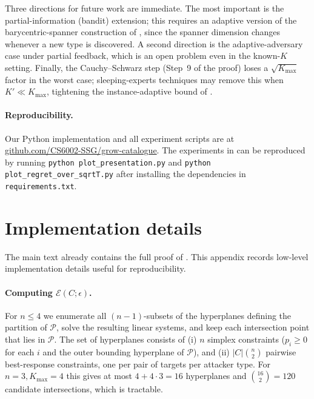 \documentclass[letterpaper,9pt,twocolumn]{extarticle}
\newcommand{\cP}{\mathcal{P}}
\newcommand{\cE}{\mathcal{E}}
\newcommand{\Kmax}{K_{\max}}
\theoremstyle{plain}
\theoremstyle{definition}
\theoremstyle{remark}
\begin{document}
Three directions for future work are immediate. The most important is the
partial-information (bandit) extension; this requires an adaptive version
of the barycentric-spanner construction of \citet[\S 6]{balcan2015},
since the spanner dimension changes whenever a new type is discovered.
A second direction is the adaptive-adversary case under partial feedback,
which is an open problem even in the known-$K$ setting. Finally, the
Cauchy--Schwarz step (Step~9 of the proof) loses a $\sqrt{\Kmax}$ factor
in the worst case; sleeping-experts techniques \citep{mourtada2017} may
remove this when $K'\ll\Kmax$, tightening the instance-adaptive bound of
.

\paragraph{Reproducibility.}
Our Python implementation and all experiment scripts are at
\textcolor{blue}{\href{https://github.com/CS6002-SSG/grow-catalogue}{github.com/CS6002-SSG/grow-catalogue}}. The experiments
in  can be reproduced by running
\texttt{python plot\_presentation.py} and
\texttt{python plot\_regret\_over\_sqrtT.py} after installing the
dependencies in \texttt{requirements.txt}.



\onecolumn
\appendix
\section{Implementation details}
\label{app:impl}

The main text already contains the full proof of . This
appendix records low-level implementation details useful for
reproducibility.

\paragraph{Computing $\cE(C;\epsilon)$.}
For $n\le 4$ we enumerate all $(n-1)$-subsets of the hyperplanes defining
the partition of $\cP$, solve the resulting linear systems, and keep
each intersection point that lies in $\cP$. The set of hyperplanes
consists of (i) $n$ simplex constraints ($p_i\ge 0$ for each $i$ and the
outer bounding hyperplane of $\cP$), and (ii) $|C|\binom{n}{2}$
pairwise best-response constraints, one per pair of targets per attacker
type. For $n=3,\Kmax=4$ this gives at most $4+4\cdot 3=16$ hyperplanes
and $\binom{16}{2}=120$ candidate intersections, which is tractable.
\end{document}
